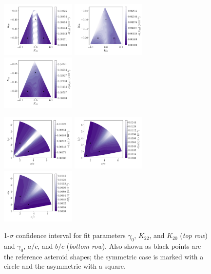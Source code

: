 \documentclass[fleqn,usenatbib]{mnras}
\begin{document}
\begin{figure}
  \includegraphics[width=0.33\textwidth]{figs/probe-space-theta-1-sigma.pdf}\hfill
  \includegraphics[width=0.33\textwidth]{figs/probe-space-theta-2-sigma.pdf}\hfill
  \includegraphics[width=0.33\textwidth]{figs/probe-space-theta-3-sigma.pdf}

  \includegraphics[width=0.33\textwidth]{figs/probe-space-ab-1-sigma.pdf}\hfill
  \includegraphics[width=0.33\textwidth]{figs/probe-space-ab-a-sigma.pdf}\hfill
  \includegraphics[width=0.33\textwidth]{figs/probe-space-ab-b-sigma.pdf}

  \caption{1-$\sigma$ confidence interval for fit parameters $\gamma_0$, $K_{22}$, and $K_{20}$ (\textit{top row}) and $\gamma_0$, $a/c$, and $b/c$ (\textit{bottom row}). Also shown as black points are the reference asteroid shapes; the symmetric case is marked with a circle and the asymmetric with a square.}
  \label{fig:scan-space-sigma}
\end{figure}
\end{document}
